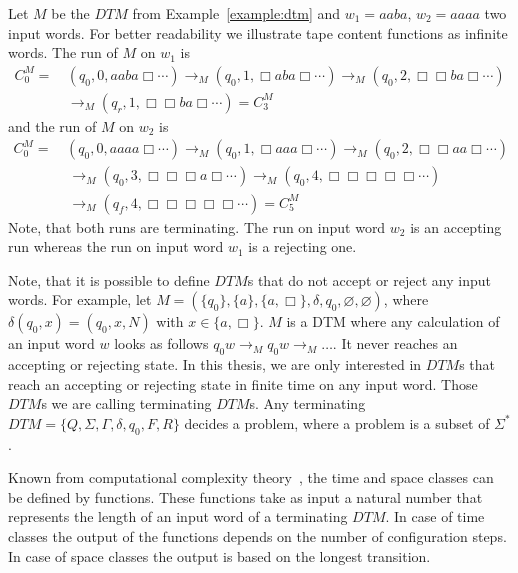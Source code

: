\begin{example}
    \label{example:run_of_dtm}
    Let $M$ be the $\mathit{DTM}$ from Example~\ref{example:dtm} and $w_1 = aaba$, $w_2 = aaaa$ two input words. For
    better readability we illustrate tape content functions as infinite words. The run of $M$ on $w_1$ is
    \begin{align*}
        C_0^M = &\,(q_0, 0, aaba\Box \dotsb) \rightarrow_M (q_0, 1, \Box aba\Box \dotsb) \rightarrow_M  (q_0, 2, \Box \Box
        ba\Box \dotsb)\\&\, \rightarrow_M (q_r, 1, \Box \Box ba\Box \dotsb) = C_3^M
    \end{align*}
    and the run of $M$ on $w_2$ is
    \begin{align*}
        C_0^M =\,&(q_0, 0, aaaa\Box \dotsb) \rightarrow_M (q_0, 1, \Box aaa\Box \dotsb) \rightarrow_M (q_0, 2, \Box \Box
        aa\Box \dotsb) \\&\,\rightarrow_M
        (q_0, 3, \Box \Box \Box a\Box \dotsb) \rightarrow_M (q_0, 4, \Box \Box \Box \Box \Box \dotsb) \\&\,\rightarrow_M
        (q_f, 4, \Box \Box \Box \Box \Box \dotsb) = C_5^M
    \end{align*}
    Note, that both runs are terminating. The run on input word $w_2$ is an accepting run whereas the run on input word $w_1$ is a rejecting one.
\end{example}

Note, that it is possible to define $\mathit{DTM}$s that do not accept or reject any input words. For example, let
$M = (\{q_0\}, \{a\}, \{a, \Box\}, \delta, q_0, \varnothing, \varnothing)$, where $\delta(q_0, x) = (q_0, x, N)$ with $x \in
\{a, \Box\}$. $M$ is a DTM where any calculation of an input word $w$ looks as follows $q_0w \rightarrow_M q_0w
\rightarrow_M \dots$. It never reaches an accepting or rejecting state. In this thesis, we are only interested in
$\mathit{DTM}$s that reach an accepting or rejecting state in finite time on any input word. Those $\mathit{DTM}$s
we are calling terminating $\mathit{DTM}$s. Any terminating $\mathit{DTM} = \{Q, \Sigma, \Gamma, \delta, q_0, F, R\}$ decides a problem, where a problem is a subset of $\Sigma^*$.

Known from computational complexity theory~\cite{papadimitriou1994complexity}, the time and space classes
can be defined by functions. These functions take as input a natural number that represents the length of an input
word of a terminating $\mathit{DTM}$. In case of time classes the output of the functions depends on the number of
configuration steps. In case of space classes the output is based on the longest transition.

